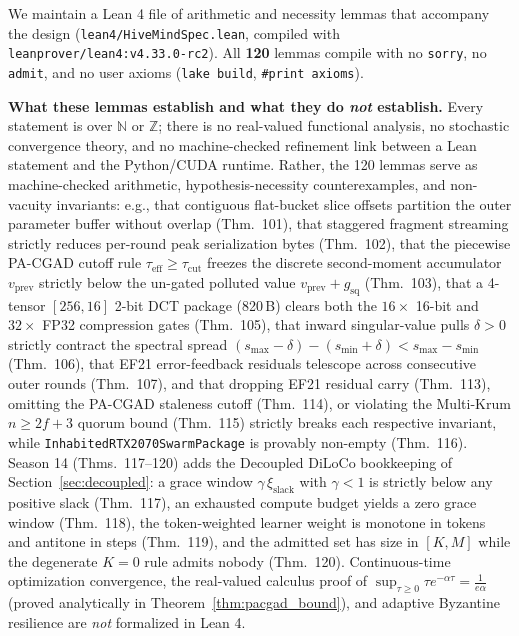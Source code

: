 \documentclass[11pt,a4paper]{article}
\begin{document}
We maintain a Lean 4 \cite{moura2021lean4} file of arithmetic and necessity lemmas that accompany the design (\texttt{lean4/HiveMindSpec.lean}, compiled with \texttt{leanprover/lean4:v4.33.0-rc2}). All \textbf{120} lemmas compile with no \texttt{sorry}, no \texttt{admit}, and no user axioms (\texttt{lake build}, \texttt{\#print axioms}).\par
\textbf{What these lemmas establish and what they do \emph{not} establish.} Every statement is over $\mathbb{N}$ or $\mathbb{Z}$; there is no real-valued functional analysis, no stochastic convergence theory, and no machine-checked refinement link between a Lean statement and the Python/CUDA runtime. Rather, the 120 lemmas serve as machine-checked arithmetic, hypothesis-necessity counterexamples, and non-vacuity invariants: e.g., that contiguous flat-bucket slice offsets partition the outer parameter buffer without overlap (Thm.~101), that staggered fragment streaming strictly reduces per-round peak serialization bytes (Thm.~102), that the piecewise PA-CGAD cutoff rule $\tau_{\text{eff}} \ge \tau_{\text{cut}}$ freezes the discrete second-moment accumulator $v_{\text{prev}}$ strictly below the un-gated polluted value $v_{\text{prev}} + g_{\text{sq}}$ (Thm.~103), that a 4-tensor $[256, 16]$ 2-bit DCT package (820\,B) clears both the $16\times$ 16-bit and $32\times$ FP32 compression gates (Thm.~105), that inward singular-value pulls $\delta > 0$ strictly contract the spectral spread $(s_{\max}-\delta) - (s_{\min}+\delta) < s_{\max} - s_{\min}$ (Thm.~106), that EF21 error-feedback residuals telescope across consecutive outer rounds (Thm.~107), and that dropping EF21 residual carry (Thm.~113), omitting the PA-CGAD staleness cutoff (Thm.~114), or violating the Multi-Krum $n \ge 2f+3$ quorum bound (Thm.~115) strictly breaks each respective invariant, while \texttt{InhabitedRTX2070SwarmPackage} is provably non-empty (Thm.~116). Season 14 (Thms.~117--120) adds the Decoupled DiLoCo bookkeeping of Section~\ref{sec:decoupled}: a grace window $\gamma\,\xi_{\text{slack}}$ with $\gamma < 1$ is strictly below any positive slack (Thm.~117), an exhausted compute budget yields a zero grace window (Thm.~118), the token-weighted learner weight is monotone in tokens and antitone in steps (Thm.~119), and the admitted set has size in $[K, M]$ while the degenerate $K = 0$ rule admits nobody (Thm.~120). Continuous-time optimization convergence, the real-valued calculus proof of $\sup_{\tau \ge 0} \tau e^{-\alpha\tau} = \frac{1}{e\alpha}$ (proved analytically in Theorem~\ref{thm:pacgad_bound}), and adaptive Byzantine resilience are \emph{not} formalized in Lean 4.
\end{document}
